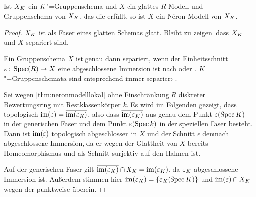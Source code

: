 \begin{Lemma}\label{nerongruppenschemaglatt}
  Ist $X_{K}$ ein $K$"=Gruppenschema und $X$ ein
  glattes $R$-Modell und Gruppenschema von $X_{K}$, das die
  \NAbbEig erfüllt, so ist $X$ ein Néron-Modell von $X_{K}$.
  \begin{proof}
    $X_{K}$ ist als Faser eines glatten Schemas glatt. Bleibt zu
    zeigen, dass $X_{K}$ und $X$ separiert sind.
    
    Ein Gruppenschema $X$ ist genau dann separiert, wenn der
    Einheitsschnitt ${\varepsilon\colon\operatorname{Spec}(R)\to X}$ eine abgeschlossene
    Immersion ist nach
    \cite[Lemma~38.6.1]{stacksproject} oder \cite[Lemma~7.1/2]{neron}.
    $K$"=Gruppenschemata sind entsprechend immer separiert
    \cite[Lemma~38.7.3]{stacksproject}. 

    Sei wegen \ref{thm:neronmodelllokal} ohne Einschränkung $R$ diskreter
    Bewertungsring mit Restklassenkörper $k$.    
    Es wird im Folgenden gezeigt, dass topologisch
    $\operatorname{im}(\varepsilon)=\overline{\operatorname{im}(\varepsilon_{K})}$,
    also dass $\overline{\operatorname{im}(\varepsilon_{K})}$ aus genau dem Punkt
    $\varepsilon(\operatorname{Spec}K)$ in der generischen Faser und dem Punkt
    $\varepsilon(\operatorname{Spec} k)$ in der speziellen Faser besteht.
    Dann ist $\operatorname{im}(\varepsilon)$ topologisch abgeschlossen in $X$ und der
    Schnitt $\epsilon$ demnach abgeschlossene Immersion, da er
    wegen der Glattheit von $X$ bereits Homeomorphismus und als
    Schnitt surjektiv auf den Halmen ist.
    
    Auf der generischen Faser gilt
    $\overline{\operatorname{im}(\varepsilon_{K})}\cap X_{K}=\operatorname{im}(\varepsilon_{K})$,
    da $\varepsilon_{K}$ abgeschlossene Immersion ist.
    Außerdem stimmen hier $\operatorname{im}(\varepsilon_{K})=\{\varepsilon_{K}(\operatorname{Spec}K)\}$
    und $\operatorname{im}(\varepsilon)\cap X_{K}$ wegen der \NAbbEig punktweise
    überein.


\end{proof}
\end{Lemma}
